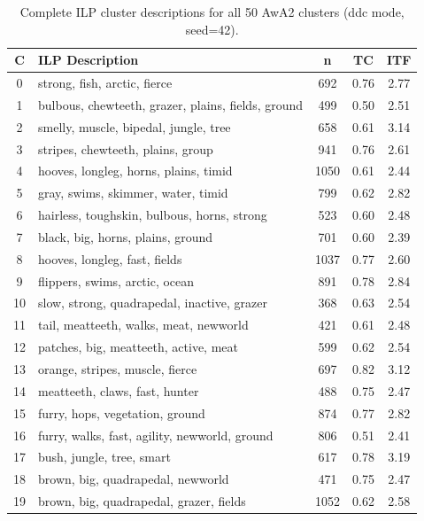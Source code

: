 \begin{table}[H]
    \centering
    \scriptsize
    \caption{Complete ILP cluster descriptions for all 50 AwA2 clusters (ddc mode, seed=42).}
    \label{tab:awa2_ilp_all}
    \begin{tabular}{clccc}
        \toprule
        \textbf{C} & \textbf{ILP Description} & \textbf{n} & \textbf{TC} & \textbf{ITF} \\
        \midrule
        0 & strong, fish, arctic, fierce & 692 & 0.76 & 2.77 \\
        1 & bulbous, chewteeth, grazer, plains, fields, ground & 499 & 0.50 & 2.51 \\
        2 & smelly, muscle, bipedal, jungle, tree & 658 & 0.61 & 3.14 \\
        3 & stripes, chewteeth, plains, group & 941 & 0.76 & 2.61 \\
        4 & hooves, longleg, horns, plains, timid & 1050 & 0.61 & 2.44 \\
        5 & gray, swims, skimmer, water, timid & 799 & 0.62 & 2.82 \\
        6 & hairless, toughskin, bulbous, horns, strong & 523 & 0.60 & 2.48 \\
        7 & black, big, horns, plains, ground & 701 & 0.60 & 2.39 \\
        8 & hooves, longleg, fast, fields & 1037 & 0.77 & 2.60 \\
        9 & flippers, swims, arctic, ocean & 891 & 0.78 & 2.84 \\
        10 & slow, strong, quadrapedal, inactive, grazer & 368 & 0.63 & 2.54 \\
        11 & tail, meatteeth, walks, meat, newworld & 421 & 0.61 & 2.48 \\
        12 & patches, big, meatteeth, active, meat & 599 & 0.62 & 2.54 \\
        13 & orange, stripes, muscle, fierce & 697 & 0.82 & 3.12 \\
        14 & meatteeth, claws, fast, hunter & 488 & 0.75 & 2.47 \\
        15 & furry, hops, vegetation, ground & 874 & 0.77 & 2.82 \\
        16 & furry, walks, fast, agility, newworld, ground & 806 & 0.51 & 2.41 \\
        17 & bush, jungle, tree, smart & 617 & 0.78 & 3.19 \\
        18 & brown, big, quadrapedal, newworld & 471 & 0.75 & 2.47 \\
        19 & brown, big, quadrapedal, grazer, fields & 1052 & 0.62 & 2.58 \\

\end{tabular}
\end{table}
